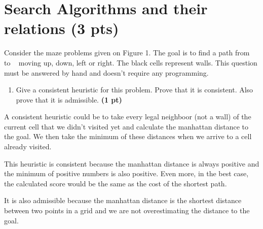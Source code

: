 \documentclass[11pt,a4paper]{report}
\begin{document}
\maketitle

\section{Search Algorithms and their relations (3 pts)}
Consider the maze problems given on Figure 1. The goal is to find a path from \Gentsroom ~ to \EURhv ~ moving up, down, left or right. The black cells represent walls. This question must be answered by hand and doesn't require any programming.

\begin{enumerate}
\item Give a consistent heuristic for this problem. Prove that it is consistent. Also prove that it is admissible. \textbf{(1 pt)}
\end{enumerate}

\begin{answers}[4cm]
	A consistent heuristic could be to take every legal neighboor (not a wall) of the current cell that we didn't visited yet and calculate the manhattan distance to the goal. We then take the minimum of these distances when we arrive to a cell already visited. 
	
	This heuristic is consistent because the manhattan distance is always positive and the minimum of positive numbers is also positive. Even more, in the best case, the calculated score would be the same as the cost of the shortest path.
	
	It is also admissible because the manhattan distance is the shortest distance between two points in a grid and we are not overestimating the distance to the goal.


\end{answers}
\end{document}

